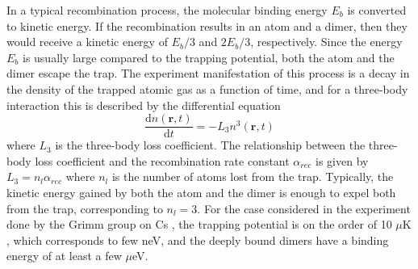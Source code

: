 \documentclass[prl,onecolumn,amsmath,amssymb,titlepage,nofootinbib,preprint]{revtex4-1}
\begin{document}
In a typical recombination process, the molecular binding energy $E_{b}$ is converted to kinetic energy.  If the recombination results in an atom and a dimer, then they would receive a kinetic energy of $E_{b}/3$ and $2E_{b}/3$, respectively.  Since the energy $E_{b}$ is usually large compared to the trapping potential, both the atom and the dimer escape the trap.  The experiment manifestation of this process is a decay in the density of the trapped atomic gas as a function of time, and for a three-body interaction this is described by the differential equation
	\begin{equation}\label{eq:3_body_recomination_equation}
		\frac{\mathrm{d}n(\mathbf{r},t)}{\mathrm{d}t}=-L_{3}n^{3}(\mathbf{r},t)
	\end{equation}
where $L_{3}$ is the three-body loss coefficient.  The relationship  between the three-body loss coefficient and the recombination rate constant $\alpha_{rec}$ is given by $L_{3}=n_{l}\alpha_{rec}$ where $n_{l}$ is the number of atoms lost from the trap.  Typically, the kinetic energy gained by both the atom and the dimer is enough to expel both from the trap, corresponding to $n_{l}=3$.  For the case considered in the experiment done by the Grimm group on Cs \cite{Huang2014}, the trapping potential is on the order of 10 $\mu\text{K}$, which corresponds to  few neV, and the deeply bound dimers have a binding energy of at least a few $\mu$eV.   
\end{document}
